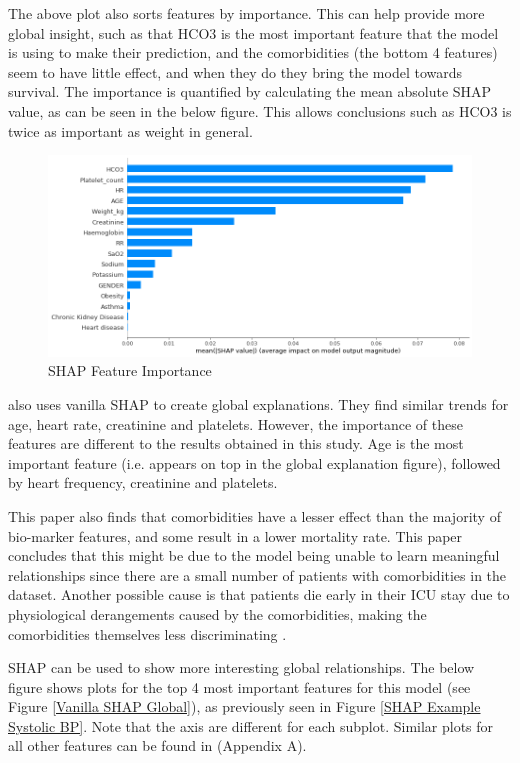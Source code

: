\documentclass[12pt]{article}
\begin{document}
The above plot also sorts features by importance. This can help provide more global insight, such as that HCO3 is the most important feature that the model is using to make their prediction, and the comorbidities (the bottom 4 features) seem to have little effect, and when they do they bring the model towards survival. 
The importance is quantified by calculating the mean absolute SHAP value, as can be seen in the below figure. This allows conclusions such as HCO3 is twice as important as weight in general. 

\begin{figure}[H]
\centering\caption{SHAP Feature Importance }
\includegraphics[scale=0.49]{Vanilla SHAP Feature Importance.png}
\end{figure}

\cite{ICUFancyLSTM} also uses vanilla SHAP to create global explanations. They find similar trends for age, heart rate, creatinine and platelets. However, the importance of these features are different to the results obtained in this study. Age is the most important feature (i.e. appears on top in the global explanation figure), followed by heart frequency, creatinine and platelets.

This paper also finds that comorbidities have a lesser effect than the majority of bio-marker features, and some result in a lower mortality rate. This paper concludes that this might be due to the model being unable to learn meaningful relationships since there are a small number of patients with comorbidities in the dataset. Another possible cause is that patients die early in their ICU stay due to physiological derangements caused by the comorbidities, making the comorbidities themselves less discriminating \cite{ICUFancyLSTM}.

SHAP can be used to show more interesting global relationships. The below figure shows plots for the top 4 most important features for this model (see Figure \ref{Vanilla SHAP Global}), as previously seen in Figure \ref{SHAP Example Systolic BP}. Note that the axis are different for each subplot. Similar plots for all other features can be found in (Appendix A).
\end{document}
